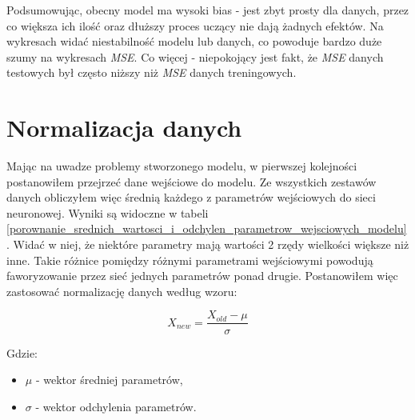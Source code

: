 \documentclass[12pt]{aghdpl}
\begin{document}
		Podsumowując, obecny model ma wysoki bias - jest zbyt prosty dla danych, przez co większa ich ilość oraz dłuższy proces uczący nie dają żadnych efektów. Na wykresach widać niestabilność modelu lub danych, co powoduje bardzo duże szumy na wykresach \textit{MSE}. Co więcej - niepokojący jest fakt, że \textit{MSE} danych testowych był często niższy niż \textit{MSE} danych treningowych.
		
		\section{Normalizacja danych} \label{normalizacja_danych}
		Mając na uwadze problemy stworzonego modelu, w pierwszej kolejności postanowiłem przejrzeć dane wejściowe do modelu. Ze wszystkich zestawów danych obliczyłem więc średnią każdego z parametrów wejściowych do sieci neuronowej. Wyniki są widoczne w tabeli \ref{porownanie_srednich_wartosci_i_odchylen_parametrow_wejsciowych_modelu}. Widać w niej, że niektóre parametry mają wartości 2 rzędy wielkości większe niż inne. Takie różnice pomiędzy różnymi parametrami wejściowymi powodują faworyzowanie przez sieć jednych parametrów ponad drugie. Postanowiłem więc zastosować normalizację danych według wzoru:
		
		\begin{equation}
		X_{new} = \frac{X_{old} - \mu}{\sigma}
		\end{equation}		 
		
		Gdzie:
		\begin{itemize}
		\item $\mu$ - wektor średniej parametrów,
		\item $\sigma$ - wektor odchylenia parametrów.
		\end{itemize}
		
\end{document}
